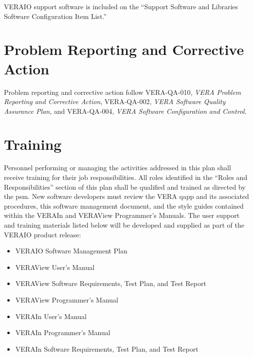 \documentclass{vera-ornltm}
\begin{document}
VERAIO support software is included on the ``Support Software and Libraries Software Configuration Item List.''


\section{Problem Reporting and Corrective Action}

Problem reporting and corrective action follow VERA-QA-010, {\it VERA Problem Reporting and Corrective Action}, VERA-QA-002, {\it VERA Software Quality Assurance Plan}, and VERA-QA-004, 
{\it VERA Software Configuration and Control}.


\section{Training}

Personnel performing or managing the activities addressed in this plan shall receive training for their job responsibilities.
All roles identified in the ``Roles and Responsibilities'' section of this plan shall be qualified and trained as directed by the \ac{psm}.
New software developers must review the VERA \ac{qapp} and its associated procedures, this software management document, and the style guides contained within the VERAIn and VERAView Programmer's Manuals.
The user support and training materials listed below will be developed and supplied as part of the VERAIO product release:
\begin{itemize}

\item VERAIO Software Management Plan
\item VERAView  User's Manual
\item VERAView  Software Requirements, Test Plan, and Test Report
\item VERAView  Programmer's Manual
\item VERAIn  User's Manual
\item VERAIn  Programmer's Manual
\item VERAIn  Software Requirements, Test Plan, and Test Report
\end{itemize}

\end{document}
